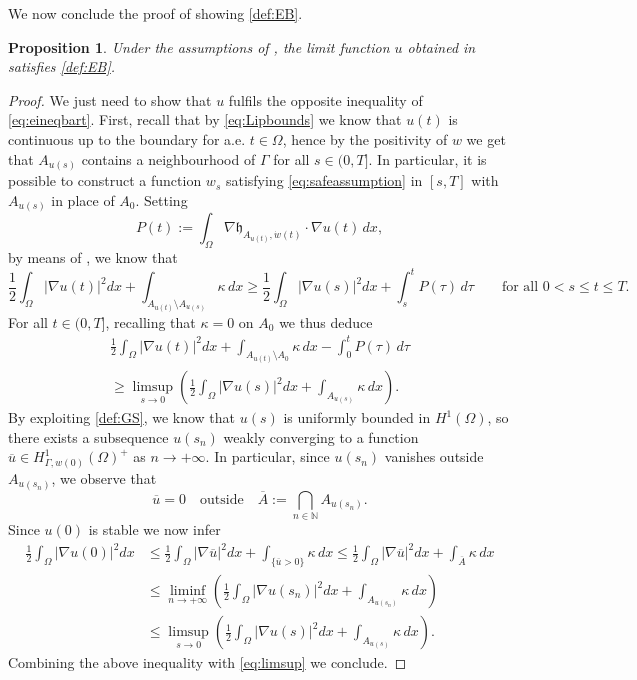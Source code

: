 \documentclass[a4paper,11pt,reqno]{amsart}
\numberwithin{equation}{section}
\newtheorem{prop}[teo]{Proposition}
\theoremstyle{definition}
\theoremstyle{remark}
\newcommand{\n}{\mathbb{N}}
\begin{document}
We now conclude the proof of  showing \ref{def:EB}.

\begin{prop}
    Under the assumptions of , the limit function $u$ obtained in  satisfies \ref{def:EB}. 
\end{prop}
\begin{proof}
    We just need to show that $u$ fulfils the opposite inequality of \eqref{eq:eineqbart}. First, recall that by \eqref{eq:Lipbounds} we know that $u(t)$ is continuous up to the boundary for a.e. $t\in\Omega$, hence by the positivity of $w$ we get that $A_{u(s)}$ contains a neighbourhood of $\Gamma$ for all $s\in(0,T]$. In particular, it is possible to construct a function $ w_{s}$ satisfying \eqref{eq:safeassumption} in $[s, T]$ with $A_{u(s)}$ in place of $A_0$.   
    Setting $$P(t):=\int_\Omega \nabla \mathfrak{h}_{A_{u(t)},\dot w(t)} \cdot \nabla u(t) \, dx,$$ by means of , we know that 
    \begin{equation}
        \frac 12 \int_\Omega |\nabla u(t)|^2 dx+\int_{A_{u(t)}\setminus A_{u(s)}}\kappa\,d x\ge   \frac 12 \int_\Omega |\nabla u(s)|^2 dx+\int_s^t P(\tau)\, d\tau\qquad\text{for all }0<s\leq  t\le T.
    \end{equation}
    For all $t\in (0,T]$, recalling that $\kappa=0$ on $A_0$ we thus deduce 
    \begin{equation}\label{eq:limsup}
        \begin{aligned}
        \frac 12 \int_\Omega |\nabla u(t)|^2 dx+\int_{A_{u(t)}\setminus A_{0}}\kappa\,d x-\int_0^t P(\tau)\, d\tau
        \\\ge \limsup\limits_{s\to 0}\left(\frac 12 \int_\Omega |\nabla u(s)|^2 dx+\int_{A_{u(s)}}\kappa\,d x\right).
    \end{aligned}
    \end{equation}
    By exploiting \ref{def:GS}, we know that $u(s)$ is uniformly bounded in $H^1(\Omega)$, so there exists a subsequence $u(s_n)$ weakly converging to a function $\overline u\in H^1_{\Gamma,w(0)}(\Omega)^+$ as $n\to +\infty$. In particular, since $u(s_n)$ vanishes outside $A_{u(s_n)}$, we observe that
    \begin{equation}
        \overline u=0\quad\text{outside}\quad \overline A:=\bigcap_{n\in \n}A_{u(s_n)}.
    \end{equation}
    Since $u(0)$ is stable we now infer
    \begin{align}
        \frac 12 \int_\Omega |\nabla u(0)|^2 dx&\le \frac 12 \int_\Omega |\nabla \overline u|^2 dx+\int_{\{\overline u>0\}}\kappa\,d x\le \frac 12 \int_\Omega |\nabla \overline u|^2 dx+\int_{\overline A
        }\kappa\,d x\\
        &\le\liminf\limits_{n\to +\infty}\left(\frac 12 \int_\Omega |\nabla u(s_n)|^2 dx+\int_{A_{u(s_n)}}\kappa\,d x\right)\\
        &\le \limsup\limits_{s\to 0}\left(\frac 12 \int_\Omega |\nabla u(s)|^2 dx+\int_{A_{u(s)}}\kappa\,d x\right).
    \end{align}
    Combining the above inequality with \eqref{eq:limsup} we conclude.
\end{proof}
\end{document}
